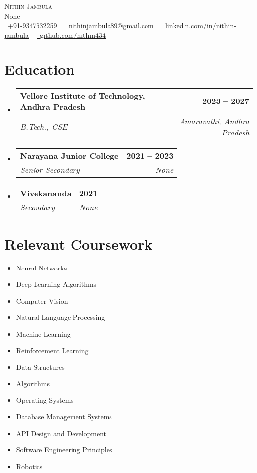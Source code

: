 \documentclass[letterpaper,11pt]{article}
\makeatletter
\newcommand{\resumeSubheading}[4]{
  \vspace{-2pt}\item
    \begin{tabular*}{1.0\textwidth}[t]{l@{\extracolsep{\fill}}r}
      \textbf{#1} & \textbf{\small #2} \\
      \textit{\small#3} & \textit{\small #4} \\
    \end{tabular*}\vspace{-7pt}
}
\newcommand{\resumeSubHeadingListStart}{\begin{itemize}[leftmargin=0.0in, label={}]}
\newcommand{\resumeSubHeadingListEnd}{\end{itemize}}
\makeatother
\begin{document}
\begin{center}
    {\Huge \scshape Nithin Jambula} \\ \vspace{1pt}
    None \\ \vspace{1pt}
    \small \raisebox{-0.1\height}\faPhone\ +91-9347632259 ~ \href{mailto:nithinjambula89@gmail.com}{\raisebox{-0.2\height}\faEnvelope\  \underline{nithinjambula89@gmail.com}} ~ 
    \href{linkedin.com/in/nithin-jambula}{\raisebox{-0.2\height}\faLinkedin\ \underline{linkedin.com/in/nithin-jambula}}  ~
    \href{github.com/nithin434}{\raisebox{-0.2\height}\faGithub\ \underline{github.com/nithin434}}
    \vspace{-8pt}
\end{center}

\section{Education}
  \resumeSubHeadingListStart
    \resumeSubheading
      {Vellore Institute of Technology, Andhra Pradesh}{2023 -- 2027}
      {B.Tech., CSE}{Amaravathi, Andhra Pradesh}
    \resumeSubheading
      {Narayana Junior College}{2021 -- 2023}
      {Senior Secondary}{None}
    \resumeSubheading
      {Vivekananda}{2021}
      {Secondary}{None}
  \resumeSubHeadingListEnd



\section{Relevant Coursework}
    \begin{multicols}{4}
        \begin{itemize}[itemsep=-5pt, parsep=3pt]
            \item\small Neural Networks
            \item\small Deep Learning Algorithms
            \item\small Computer Vision
            \item\small Natural Language Processing
            \item\small Machine Learning
            \item\small Reinforcement Learning
            \item\small Data Structures
            \item\small Algorithms
            \item\small Operating Systems
            \item\small Database Management Systems
            \item\small API Design and Development
            \item\small Software Engineering Principles
            \item\small Robotics
        \end{itemize}
    \end{multicols}
    \vspace*{2.0\multicolsep}
\end{document}
